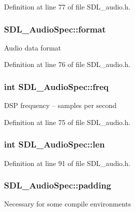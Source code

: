 Definition at line 77 of file S\+D\+L\+\_\+audio.\+h.

\hypertarget{struct_s_d_l___audio_spec_a6eda133f50c3be8d0ba91f8dee830be8}{}
\subsubsection[{format}]{ S\+D\+L\+\_\+\+Audio\+Spec\+::format}\label{struct_s_d_l___audio_spec_a6eda133f50c3be8d0ba91f8dee830be8}
Audio data format 

Definition at line 76 of file S\+D\+L\+\_\+audio.\+h.

\hypertarget{struct_s_d_l___audio_spec_a8b823ce46fc2e448cf7e6fc141aff6b2}{}
\subsubsection[{freq}]{\setlength{\rightskip}{0pt plus 5cm}int S\+D\+L\+\_\+\+Audio\+Spec\+::freq}\label{struct_s_d_l___audio_spec_a8b823ce46fc2e448cf7e6fc141aff6b2}
D\+S\+P frequency -- samples per second 

Definition at line 75 of file S\+D\+L\+\_\+audio.\+h.

\hypertarget{struct_s_d_l___audio_spec_ab6f999b1bf0ee080b42f4f6a5f59ee47}{}
\subsubsection[{len}]{ int S\+D\+L\+\_\+\+Audio\+Spec\+::len}\label{struct_s_d_l___audio_spec_ab6f999b1bf0ee080b42f4f6a5f59ee47}


Definition at line 91 of file S\+D\+L\+\_\+audio.\+h.

\hypertarget{struct_s_d_l___audio_spec_a738371fc13b54cefef4db16994abeeb6}{}
\subsubsection[{padding}]{ S\+D\+L\+\_\+\+Audio\+Spec\+::padding}\label{struct_s_d_l___audio_spec_a738371fc13b54cefef4db16994abeeb6}
Necessary for some compile environments 

